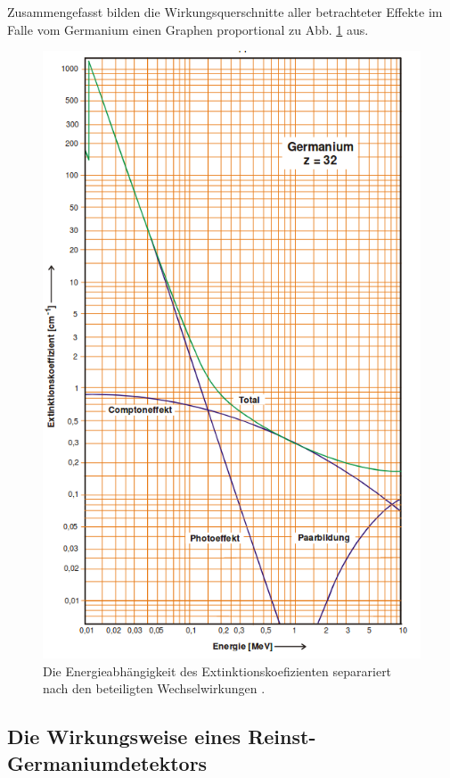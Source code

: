 Zusammengefasst bilden die Wirkungsquerschnitte aller betrachteter Effekte im Falle vom Germanium einen Graphen proportional zu Abb. \ref{fig:effekt} aus. %

\begin{figure}
	\centering
	\includegraphics[width=\linewidth-100pt,height=\textheight-100pt,keepaspectratio]{content/Images/effekt.png}
    \caption{Die Energieabhängigkeit des Extinktionskoefizienten separariert nach den beteiligten Wechselwirkungen \cite{V18}.}
    \label{fig:effekt}
\end{figure}

\subsection{Die Wirkungsweise eines Reinst-Germaniumdetektors}

